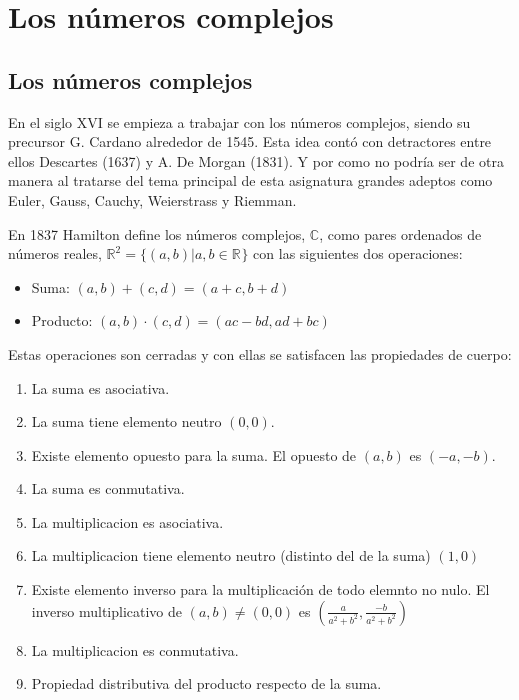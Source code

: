 \chapter{Los números complejos}

\section{Los números complejos}
En el siglo XVI se empieza a trabajar con los números complejos, siendo su precursor G. Cardano alrededor de 1545.
Esta idea contó con detractores entre ellos Descartes (1637) y A. De Morgan (1831).
Y por como no podría ser de otra manera al tratarse del tema principal de esta asignatura grandes adeptos como Euler, Gauss, Cauchy, Weierstrass y Riemman.

En 1837 Hamilton define los números complejos, \(\mathbb{C}\), como pares ordenados de números reales, \(\mathbb{R}^{2}=\{(a,b) | a,b \in \mathbb{R}^{}\}\) con las siguientes dos operaciones:

\begin{itemize}
  \item Suma: \((a,b)+(c,d) = (a+c, b+d)\)
  \item Producto: \((a,b)\cdot(c,d) = (ac-bd, ad+bc)\)
\end{itemize}

Estas operaciones son cerradas y con ellas se satisfacen las propiedades de cuerpo:

\begin{enumerate}
  \item La suma es asociativa.
  \item La suma tiene elemento neutro \((0,0)\).
  \item Existe elemento opuesto para la suma. El opuesto de \((a,b)\) es \((-a,-b)\).
  \item La suma es conmutativa.
  \item La multiplicacion es asociativa.
  \item La multiplicacion tiene elemento neutro (distinto del de la suma) \((1,0)\)
  \item Existe elemento inverso para la multiplicación de todo elemnto no nulo. El inverso multiplicativo de \((a,b) \neq (0,0)\) es \((\frac{a}{a^2+b^2},\frac{-b}{a^2+b^2})\)
  \item La multiplicacion es conmutativa.
  \item Propiedad distributiva del producto respecto de la suma.
\end{enumerate}

